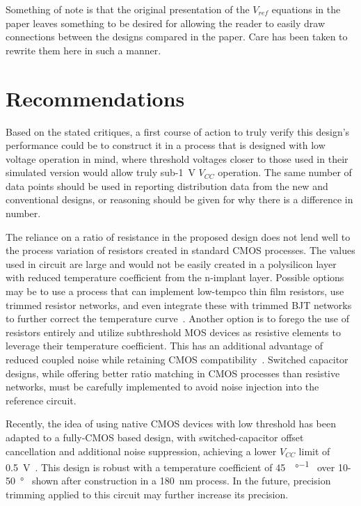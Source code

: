 \documentclass[journal]{IEEEtran}
\begin{document}
Something of note is that the original presentation of the \(V_{ref}\) equations in the paper leaves something to be desired for allowing the reader to easily draw connections between the designs compared in the paper. Care has been taken to rewrite them here in such a manner.

\section{Recommendations}

Based on the stated critiques, a first course of action to truly verify this design's performance could be to construct it in a process that is designed with low voltage operation in mind, where threshold voltages closer to those used in their simulated version would allow truly sub-\qty{1}{\V} \(V_{CC}\) operation. The same number of data points should be used in reporting distribution data from the new and conventional designs, or reasoning should be given for why there is a difference in number. 

The reliance on a ratio of resistance in the proposed design does not lend well to the process variation of resistors created in standard CMOS processes. The values used in circuit are large and would not be easily created in a polysilicon layer with reduced temperature coefficient from the n-implant layer. Possible options may be to use a process that can implement low-tempco thin film resistors, use trimmed resistor networks, and even integrate these with trimmed BJT networks to further correct the temperature curve~\cite{Brokaw1974,Malcovati2001,Mok2004}. Another option is to forego the use of resistors entirely and utilize subthreshold MOS devices as resistive elements to leverage their temperature coefficient. This has an additional advantage of reduced coupled noise while retaining CMOS compatibility~\cite{Buck2002}. Switched capacitor designs, while offering better ratio matching in CMOS processes than resistive networks, must be carefully implemented to avoid noise injection into the reference circuit.

Recently, the idea of using native CMOS devices with low threshold has been adapted to a fully-CMOS based design, with switched-capacitor offset cancellation and additional noise suppression, achieving a lower \(V_{CC}\) limit of \qty{0.5}{\V}~\cite{Ria2021}. This design is robust with a temperature coefficient of \qty{45}{\ppm\per\degree\C} over 10-\qty{50}{\degree\C} shown after construction in a \qty{180}{\nm} process. In the future, precision trimming applied to this circuit may further increase its precision.
\end{document}

